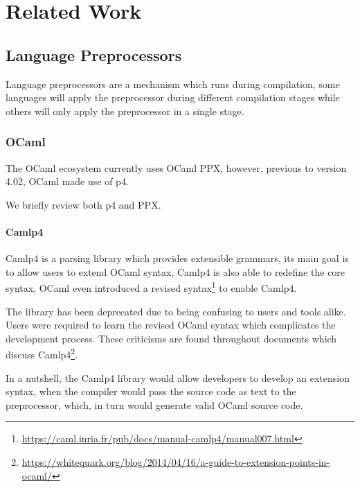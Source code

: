 \chapter{Related Work}\label{cha:related-work}

\section{Language Preprocessors}\label{sec:lang-preprocessors}

Language preprocessors are a mechanism which runs during compilation,
some languages will apply the preprocessor during different compilation stages while others will only apply the preprocessor in a single stage.


\subsection{OCaml}\label{sec:lang-preprocessors:ocaml}

The OCaml ecosystem currently uses OCaml \gls{PPX},
however, previous to version 4.02, OCaml made use of \gls{p4}.

We briefly review both \gls{p4} and \gls{PPX}.

\subsubsection*{Camlp4}\label{sec:lang-preprocessors:ocaml:p4}

Camlp4 is a parsing library which provides extensible grammars,
its main goal is to allow users to extend OCaml syntax,
Camlp4 is also able to redefine the core syntax,
OCaml even introduced a revised syntax\footnote{\url{https://caml.inria.fr/pub/docs/manual-camlp4/manual007.html}} to enable Camlp4.

The library has been deprecated due to being confusing to users and tools alike.
Users were required to learn the revised OCaml syntax which complicates the development process.
These criticisms are found throughout documents which discuss Camlp4\footnote{\url{https://whitequark.org/blog/2014/04/16/a-guide-to-extension-points-in-ocaml/}}.

In a nutshell, the Camlp4 library would allow developers to develop an extension syntax,
when the compiler would pass the source code as text to the preprocessor,
which, in turn would generate valid OCaml source code.

